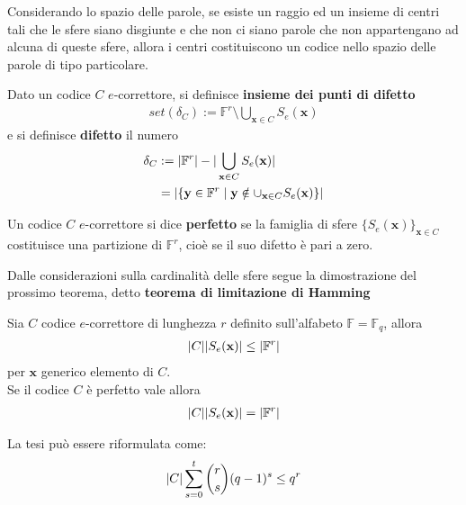 Considerando lo spazio delle parole, se esiste un raggio ed un insieme di centri tali che le sfere siano disgiunte e che non ci siano parole che non appartengano ad alcuna di queste sfere, allora i centri costituiscono un codice nello spazio delle parole di tipo particolare.
\begin{definizione}
   Dato un codice $C$ $e$-correttore, si definisce {\bf insieme dei punti di difetto}
   \begin{align*}
      set(\delta_{C})
      :=  \mathbb{F}^{r} \setminus  \bigcup_{\mathbf{x} \in C} S_{e}(\mathbf{x})
   \end{align*}
   e si definisce {\bf difetto} il numero
   \begin{align*}
      \delta_{C}
      &:= \arrowvert \mathbb{F}^{r} \arrowvert - \arrowvert \bigcup_{\mathbf{x} \in C} S_{e}(\mathbf{x}) \arrowvert \\
      &= \arrowvert \lbrace \mathbf{y} \in \mathbb{F}^{r} \mid \mathbf{y} \notin \cup_{\mathbf{x} \in C} S_{e}(\mathbf{x}) \rbrace \arrowvert
   \end{align*}
\end{definizione}
\begin{definizione}
   Un codice $C$ $e$-correttore si dice {\bf perfetto} se la famiglia di sfere  $\lbrace S_{e}(\mathbf{x}) \rbrace_{\mathbf{x} \in C} $ costituisce una partizione di $\mathbb{F}^{r}$, cioè se il suo difetto è pari a zero.
\end{definizione}
\noindent
Dalle considerazioni sulla cardinalità delle sfere segue la dimostrazione del prossimo teorema, detto {\bf teorema di limitazione di Hamming}
\begin{teorema}\label{cap2_1:teolimhamming}
   Sia $C$ codice $e$-correttore di lunghezza $r$ definito sull'alfabeto $\mathbb{F}=\mathbb{F}_{q}$, allora
   \begin{align*}
      \arrowvert C \arrowvert  \arrowvert S_{e}(\mathbf{x})  \arrowvert  \leq \arrowvert \mathbb{F}^{r} \arrowvert
   \end{align*}
   per $\mathbf{x}$ generico elemento di $C$.\\
   Se il codice $C$ è perfetto vale allora
   \begin{align*}
      \arrowvert C \arrowvert  \arrowvert S_{e}(\mathbf{x})  \arrowvert  = \arrowvert \mathbb{F}^{r} \arrowvert
   \end{align*}
\end{teorema}
\noindent
La tesi può essere riformulata come:
\begin{align*}
   \arrowvert C \arrowvert  \sum_{s=0}^{t} \binom{r}{s}(q-1)^{s} \leq q^r
\end{align*}
